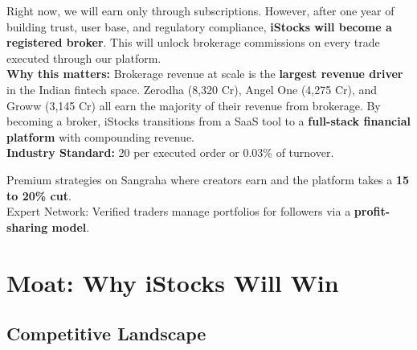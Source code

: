 \documentclass[11pt,a4paper]{article}
\newcommand{\rupee}{\text{\textrupee}}
\begin{document}
\begin{highlightbox}
Right now, we will earn only through subscriptions. However, after one year of building trust, user base, and regulatory compliance, \textbf{iStocks will become a registered broker}. This will unlock brokerage commissions on every trade executed through our platform.\\[0.5em]
\textbf{Why this matters:} Brokerage revenue at scale is the \textbf{largest revenue driver} in the Indian fintech space. Zerodha (\rupee8,320 Cr), Angel One (\rupee4,275 Cr), and Groww (\rupee3,145 Cr) all earn the majority of their revenue from brokerage. By becoming a broker, iStocks transitions from a SaaS tool to a \textbf{full-stack financial platform} with compounding revenue.\\[0.5em]
\textbf{Industry Standard:} \rupee20 per executed order or 0.03\% of turnover.
\end{highlightbox}

\begin{highlightbox}
Premium strategies on Sangraha where creators earn and the platform takes a \textbf{15 to 20\% cut}.\\[0.3em]
Expert Network: Verified traders manage portfolios for followers via a \textbf{profit-sharing model}.
\end{highlightbox}

\newpage

\section{Moat: Why iStocks Will Win}

\subsection{Competitive Landscape}
\end{document}
